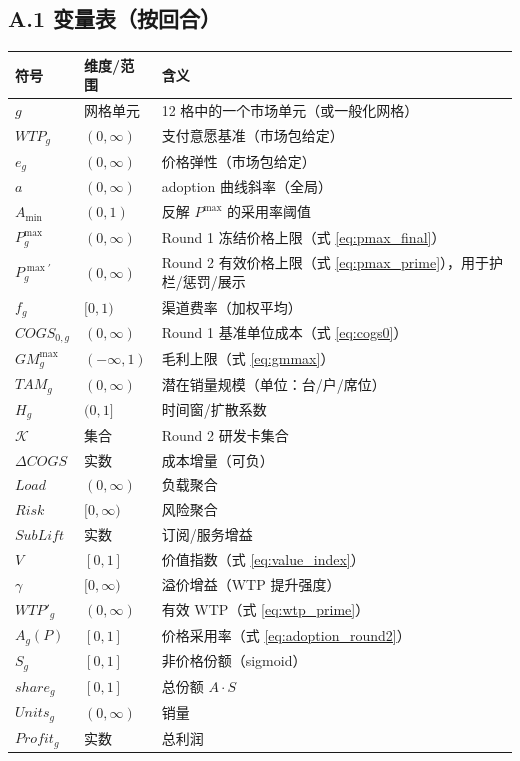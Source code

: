 \documentclass[UTF8,12pt]{ctexart}
\begin{document}
\subsection{A.1 变量表（按回合）}
\begin{longtable}{p{}p{}p{}}
\toprule
符号 & 维度/范围 & 含义 \\
\midrule
$g$ & 网格单元 & 12 格中的一个市场单元（或一般化网格）\\
$WTP_g$ & $(0,\infty)$ & 支付意愿基准（市场包给定）\\
$e_g$ & $(0,\infty)$ & 价格弹性（市场包给定）\\
$a$ & $(0,\infty)$ & adoption 曲线斜率（全局）\\
$A_{\min}$ & $(0,1)$ & 反解 $P^{\max}$ 的采用率阈值\\
$P^{\max}_g$ & $(0,\infty)$ & Round 1 冻结价格上限（式 \eqref{eq:pmax_final}）\\
$P^{\max\prime}_g$ & $(0,\infty)$ & Round 2 有效价格上限（式 \eqref{eq:pmax_prime}），用于护栏/惩罚/展示\\
$f_g$ & $[0,1)$ & 渠道费率（加权平均）\\
$COGS_{0,g}$ & $(0,\infty)$ & Round 1 基准单位成本（式 \eqref{eq:cogs0}）\\
$GM^{\max}_g$ & $(-\infty,1)$ & 毛利上限（式 \eqref{eq:gmmax}）\\
$TAM_g$ & $(0,\infty)$ & 潜在销量规模（单位：台/户/席位）\\
$H_g$ & $(0,1]$ & 时间窗/扩散系数\\
$\mathcal{K}$ & 集合 & Round 2 研发卡集合\\
$\Delta COGS$ & 实数 & 成本增量（可负）\\
$Load$ & $(0,\infty)$ & 负载聚合\\
$Risk$ & $[0,\infty)$ & 风险聚合\\
$SubLift$ & 实数 & 订阅/服务增益\\
$V$ & $[0,1]$ & 价值指数（式 \eqref{eq:value_index}）\\
$\gamma$ & $[0,\infty)$ & 溢价增益（WTP 提升强度）\\
$WTP'_g$ & $(0,\infty)$ & 有效 WTP（式 \eqref{eq:wtp_prime}）\\
$A_g(P)$ & $[0,1]$ & 价格采用率（式 \eqref{eq:adoption_round2}）\\
$S_g$ & $[0,1]$ & 非价格份额（sigmoid）\\
$share_g$ & $[0,1]$ & 总份额 $A\cdot S$\\
$Units_g$ & $(0,\infty)$ & 销量\\
$Profit_g$ & 实数 & 总利润\\
\bottomrule
\end{longtable}
\end{document}
